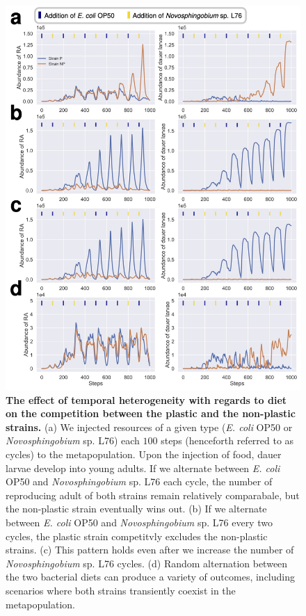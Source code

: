 \documentclass[10pt,letterpaper]{article}
\newcommand{\ecoli}{\emph{E. coli} OP50}
\newcommand{\novo}{\emph{Novosphingobium} sp. L76}
\begin{document}
\begin{figure}
\begin{adjustwidth}{-2in}{0in}
    \begin{flushright}
\includegraphics[width=120mm]{figures/figure4.jpg}
\caption{\textbf{The effect of temporal heterogeneity with regards to diet on the competition between the plastic and the non-plastic strains.} (a) We injected resources of a given type (\ecoli{} or \novo{}) each $100$ steps (henceforth referred to as cycles) to the metapopulation. Upon the injection of food, dauer larvae develop into young adults. If we alternate between \ecoli{} and \novo{} each cycle, the number of reproducing adult of both strains remain relatively comparabale, but the non-plastic strain eventually wins out. (b) If we alternate between \ecoli{} and \novo{} every two cycles, the plastic strain competitvly excludes the non-plastic strains. (c) This pattern holds even after we increase the number of \novo{}  cycles. (d) Random alternation between the two bacterial diets can produce a variety of outcomes, including scenarios where both strains transiently coexist in the metapopulation.}
\label{fig:fig4}
\end{flushright}
\end{adjustwidth}
\end{figure}
\end{document}
